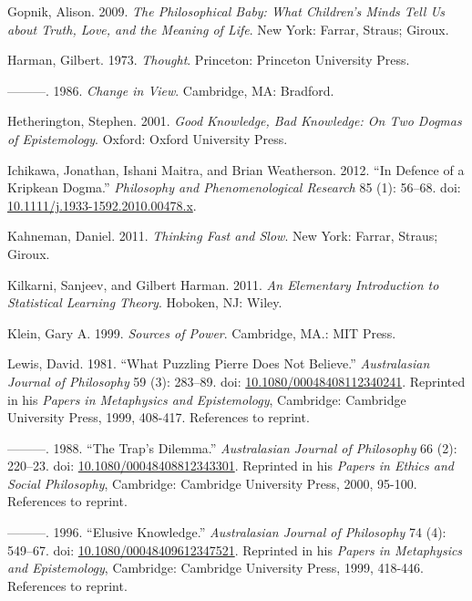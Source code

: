 \documentclass[
  11pt,
  letterpaper,
  DIV=11,
  numbers=noendperiod,
  twoside]{scrartcl}
\newlength{\cslhangindent}
\newenvironment{CSLReferences}[2] %
 {\begin{list}{}{%
  \setlength{\itemindent}{0pt}
  \setlength{\leftmargin}{0pt}
  \setlength{\parsep}{0pt}
  \ifodd #1
   \setlength{\leftmargin}{\cslhangindent}
   \setlength{\itemindent}{-1\cslhangindent}
  \fi
  \setlength{\itemsep}{#2\baselineskip}}}
 {\end{list}}
\begin{document}
\begin{CSLReferences}{1}{0}
Gopnik, Alison. 2009. \emph{The Philosophical Baby: What Children's
Minds Tell Us about Truth, Love, and the Meaning of Life}. New York:
Farrar, Straus; Giroux.

Harman, Gilbert. 1973. \emph{Thought}. Princeton: Princeton University
Press.

---------. 1986. \emph{Change in View}. Cambridge, MA: Bradford.

Hetherington, Stephen. 2001. \emph{Good Knowledge, Bad Knowledge: On Two
Dogmas of Epistemology}. Oxford: Oxford University Press.

Ichikawa, Jonathan, Ishani Maitra, and Brian Weatherson. 2012. {``In
Defence of a Kripkean Dogma.''} \emph{Philosophy and Phenomenological
Research} 85 (1): 56--68. doi:
\href{https://doi.org/10.1111/j.1933-1592.2010.00478.x}{10.1111/j.1933-1592.2010.00478.x}.

Kahneman, Daniel. 2011. \emph{Thinking Fast and Slow}. New York: Farrar,
Straus; Giroux.

Kilkarni, Sanjeev, and Gilbert Harman. 2011. \emph{An Elementary
Introduction to Statistical Learning Theory}. Hoboken, NJ: Wiley.

Klein, Gary A. 1999. \emph{Sources of Power}. Cambridge, MA.: {MIT}
Press.

Lewis, David. 1981. {``What Puzzling {P}ierre Does Not Believe.''}
\emph{Australasian Journal of Philosophy} 59 (3): 283--89. doi:
\href{https://doi.org/10.1080/00048408112340241}{10.1080/00048408112340241}.
Reprinted in his \emph{Papers in Metaphysics and Epistemology},
Cambridge: Cambridge University Press, 1999, 408-417. References to
reprint.

---------. 1988. {``The Trap's Dilemma.''} \emph{Australasian Journal of
Philosophy} 66 (2): 220--23. doi:
\href{https://doi.org/10.1080/00048408812343301}{10.1080/00048408812343301}.
Reprinted in his \emph{Papers in Ethics and Social Philosophy},
Cambridge: Cambridge University Press, 2000, 95-100. References to
reprint.

---------. 1996. {``Elusive Knowledge.''} \emph{Australasian Journal of
Philosophy} 74 (4): 549--67. doi:
\href{https://doi.org/10.1080/00048409612347521}{10.1080/00048409612347521}.
Reprinted in his \emph{Papers in Metaphysics and Epistemology},
Cambridge: Cambridge University Press, 1999, 418-446. References to
reprint.


\end{CSLReferences}
\end{document}
